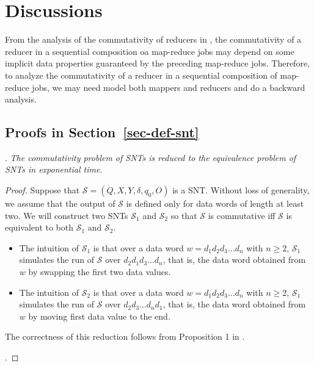 \documentclass[runningheads,a4paper]{llncs}
\def\Ss{{\mathcal{S} }}
\begin{document}
\section{Discussions}

From the analysis of the commutativity of reducers in \cite{XZZ+14}, the commutativity of a reducer in a sequential composition oa map-reduce jobs may depend on some implicit data properties guaranteed by the preceding map-reduce jobs. Therefore, to analyze the commutativity of a reducer in a sequential composition of map-reduce jobs, we may need model both mappers and reducers and do a backward analysis.





\newpage

\begin{appendix}

\section{Proofs in Section~\ref{sec-def-snt}}

. 
\emph{The commutativity problem of SNTs is reduced to the equivalence problem of SNTs in exponential time}.

\begin{proof}
Suppose that $\Ss=(Q, X, Y, \delta, q_0, O)$ is a SNT. Without loss of generality, we assume that the output of $\Ss$ is defined only for data words of length at least two. We will construct two SNTs $\Ss_1$ and $\Ss_2$ so that $\Ss$ is commutative iff $\Ss$ is equivalent to both $\Ss_1$ and $\Ss_2$.
\begin{itemize}
\item The intuition of $\Ss_1$ is that over a data word $w=d_1 d_2 d_3 \dots d_n$ with $n\ge 2$, $\Ss_1$ simulates the run of $\Ss$ over $d_2 d_1 d_3 \dots d_n$, that is, the data word obtained from $w$ by swapping the first two data values.
%
\item The intuition of $\Ss_2$ is that over a data word $w=d_1 d_2 d_3 \dots d_n$ with $n\ge 2$, $\Ss_1$ simulates the run of $\Ss$ over $d_2 d_3 \dots d_n d_1$, that is, the data word obtained from $w$ by moving first data value to the end. 
\end{itemize}
The correctness of this reduction follows from Proposition 1 in \cite{CHSW15}.

\smallskip

\noindent {\it The construction of $\Ss_1$}.


\end{proof}
\end{appendix}
\end{document}
